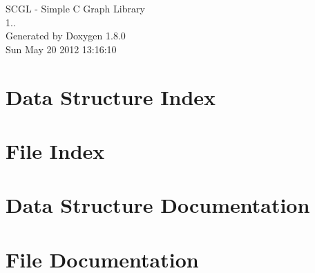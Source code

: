 \documentclass{book}
\begin{document}
\begin{titlepage}
\vspace*{7cm}
\begin{center}
{\Large S\-C\-G\-L -\/ Simple C Graph Library \\[1ex]\large 1.. }\\
\vspace*{1cm}
{\large Generated by Doxygen 1.8.0}\\
\vspace*{0.5cm}
{\small Sun May 20 2012 13:16:10}\\
\end{center}
\end{titlepage}
\clearemptydoublepage
{}
\tableofcontents
\clearemptydoublepage
{}
\chapter{Data Structure Index}

\chapter{File Index}

\chapter{Data Structure Documentation}




\chapter{File Documentation}






\printindex
\end{document}
